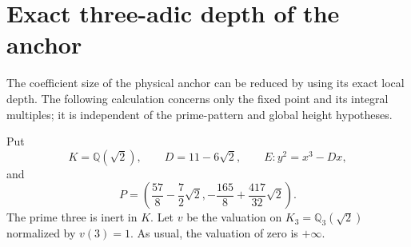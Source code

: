 \documentclass[11pt,a4paper]{article}
\theoremstyle{definition}
\theoremstyle{remark}
\begin{document}
\section{Exact three-adic depth of the anchor}
\label{sec:three-adic-anchor-depth}

The coefficient size of the physical anchor can be reduced by using its
exact local depth.  The following calculation concerns only the fixed
point and its integral multiples; it is independent of the prime-pattern
and global height hypotheses.

Put
\[
 K=\mathbb Q(\sqrt2),\qquad D=11-6\sqrt2,\qquad
 E:y^2=x^3-Dx,
\]
and
\[
 P=\left(\frac{57}{8}-\frac72\sqrt2,
          -\frac{165}{8}+\frac{417}{32}\sqrt2\right).
\]
The prime three is inert in $K$.  Let $v$ be the valuation on
$K_3=\mathbb Q_3(\sqrt2)$ normalized by $v(3)=1$.
As usual, the valuation of zero is $+\infty$.
\end{document}
